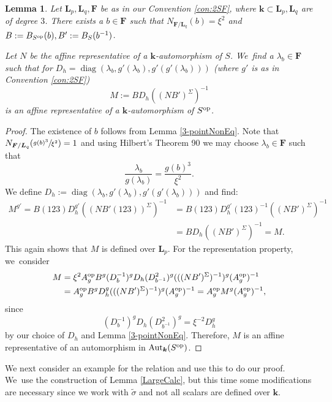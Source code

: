 \documentclass[JEP,XML,SOM,Unicode,NoFloatCountersInSection, NoEqCountersInSection,published]{cedram}
\newcommand{\op}{\textup{op}}
\DeclareMathOperator{\diag}{diag}
\newtheorem{lemma}[theorem]{Lemma}
\theoremstyle{definition}
\newcommand{\kk}{{\boldsymbol{k}}}
\newcommand{\FF}{{\boldsymbol{F}}}
\newcommand{\LL}{{\boldsymbol{L}}}
\DeclareMathOperator{\Aut}{Aut}
\begin{document}
\begin{lemma} \label{A3}
Let $\LL_p, \LL_q,\FF$ be as in our Convention \ref{con:2SF}, where $\kk \subset \LL_p, \LL_q$ are of degree $3$. There exists a $b \in \FF$ such that $N_{\FF/\LL_q}(b) = \xi^2$ and $B:= B_{S^{\op}}(b), B':= B_S(b^{-1})$.

Let $N$ be the affine representative of a $\kk$-automorphism of $S$. We~find a $\lambda_b \in \FF$ such that for $D_h = \diag(\lambda_b, g'(\lambda_b), g'(g'(\lambda_b)))$ (where $g'$ is as in Convention \ref{con:2SF})
\[
M := B D_h ((NB')^{\Sigma})^{-1}
\]
is an affine representative of a $\kk$-automorphism of $S^{\op}$.
\end{lemma}

\begin{proof}
The existence of $b$ follows from Lemma \ref{3-pointNonEq}. Note that $N_{\FF/\LL_q}(\sfrac{g(b)^3}{\xi^2}) = 1$ and using Hilbert's Theorem 90 we may choose $\lambda_b \in \FF$ such that\vspace*{-3pt}
\[
\frac{\lambda_b}{g(\lambda_b)} = \frac{g(b)^3}{\xi^2}.
\]
We define $D_h := \diag(\lambda_b, g'(\lambda_b),g'(g'(\lambda_b)))$ and find:
\begin{align*}
M^{g'} = B (123) D_h^{g'} ((N B' (123))^{\Sigma})^{-1} &= B (123) D_h^{g'} (123)^{-1} ((NB')^{\Sigma})^{-1}
\\
&= B D_h ((NB')^{\Sigma})^{-1} = M.
\end{align*}
This again shows that $M$ is defined over $\LL_p$. For the representation property, we~consider\vspace*{-3pt}
\begin{align*}
M &= \xi^2 A_g^{\op} B^g (D_b^{-1})^g D_h (D_{b^{-1}}^2)^g (((NB')^{\Sigma})^{-1})^g (A_g^{\op})^{-1}
\\
&= A_g^{\op} B^g D_h^g (((NB')^{\Sigma})^{-1})^g (A_g^{\op})^{-1} = A_g^{\op} M^g (A_g^{\op})^{-1},
\end{align*}
since\vspace*{-3pt}
\[
(D_b^{-1})^g D_h (D_{b^{-1}}^2)^g = \xi^{-2}D_h^g
\]
by our choice of $D_h$ and Lemma \ref{3-pointNonEq}. Therefore, $M$ is an affine representative of an automorphism in $\Aut_{\kk}(S^{\op})$.
\end{proof}

We next consider an example for the relation and use this to do our proof. We~use the construction of Lemma \ref{LargeCalc}, but this time some modifications are necessary since we work with $\tilde \sigma$ and not all scalars are defined over $\kk$.
\end{document}

